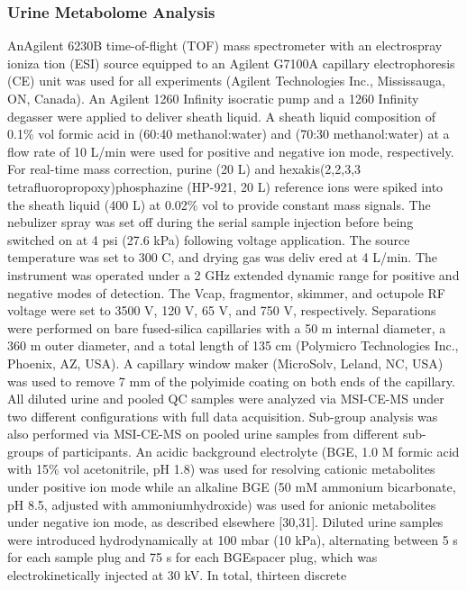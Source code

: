 \documentclass[journal=jacsat,manuscript=article]{achemso}
\begin{document}
\subsubsection{Urine Metabolome
Analysis}\label{urine-metabolome-analysis}

AnAgilent 6230B time-of-flight (TOF) mass spectrometer with an
electrospray ioniza tion (ESI) source equipped to an Agilent G7100A
capillary electrophoresis (CE) unit was used for all experiments
(Agilent Technologies Inc., Mississauga, ON, Canada). An Agilent 1260
Infinity isocratic pump and a 1260 Infinity degasser were applied to
deliver sheath liquid. A sheath liquid composition of 0.1\% vol formic
acid in (60:40 methanol:water) and (70:30 methanol:water) at a flow rate
of 10 L/min were used for positive and negative ion mode, respectively.
For real-time mass correction, purine (20 L) and hexakis(2,2,3,3
tetrafluoropropoxy)phosphazine (HP-921, 20 L) reference ions were spiked
into the sheath liquid (400 L) at 0.02\% vol to provide constant mass
signals. The nebulizer spray was set off during the serial sample
injection before being switched on at 4 psi (27.6 kPa) following voltage
application. The source temperature was set to 300 C, and drying gas was
deliv ered at 4 L/min. The instrument was operated under a 2 GHz
extended dynamic range for positive and negative modes of detection. The
Vcap, fragmentor, skimmer, and octupole RF voltage were set to 3500 V,
120 V, 65 V, and 750 V, respectively. Separations were performed on bare
fused-silica capillaries with a 50 m internal diameter, a 360 m outer
diameter, and a total length of 135 cm (Polymicro Technologies Inc.,
Phoenix, AZ, USA). A capillary window maker (MicroSolv, Leland, NC, USA)
was used to remove 7 mm of the polyimide coating on both ends of the
capillary. All diluted urine and pooled QC samples were analyzed via
MSI-CE-MS under two different configurations with full data acquisition.
Sub-group analysis was also performed via MSI-CE-MS on pooled urine
samples from different sub-groups of participants. An acidic background
electrolyte (BGE, 1.0 M formic acid with 15\% vol acetonitrile, pH 1.8)
was used for resolving cationic metabolites under positive ion mode
while an alkaline BGE (50 mM ammonium bicarbonate, pH 8.5, adjusted with
ammoniumhydroxide) was used for anionic metabolites under negative ion
mode, as described elsewhere {[}30,31{]}. Diluted urine samples were
introduced hydrodynamically at 100 mbar (10 kPa), alternating between 5
s for each sample plug and 75 s for each BGEspacer plug, which was
electrokinetically injected at 30 kV. In total, thirteen discrete
\end{document}
